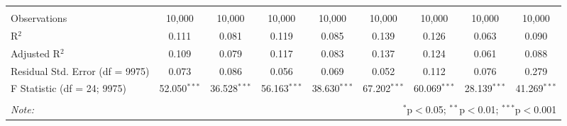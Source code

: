 \begin{table}[!htbp]
\begin{tabular}{@{\extracolsep{5pt}}lcccccccc}
 \hline \\[-1.8ex] 
Observations & 10,000 & 10,000 & 10,000 & 10,000 & 10,000 & 10,000 & 10,000 & 10,000 \\ 
R$^{2}$ & 0.111 & 0.081 & 0.119 & 0.085 & 0.139 & 0.126 & 0.063 & 0.090 \\ 
Adjusted R$^{2}$ & 0.109 & 0.079 & 0.117 & 0.083 & 0.137 & 0.124 & 0.061 & 0.088 \\ 
Residual Std. Error (df = 9975) & 0.073 & 0.086 & 0.056 & 0.069 & 0.052 & 0.112 & 0.076 & 0.279 \\ 
F Statistic (df = 24; 9975) & 52.050$^{***}$ & 36.528$^{***}$ & 56.163$^{***}$ & 38.630$^{***}$ & 67.202$^{***}$ & 60.069$^{***}$ & 28.139$^{***}$ & 41.269$^{***}$ \\ 
\hline 
\hline \\[-1.8ex] 
\textit{Note:}  & \multicolumn{8}{r}{$^{*}$p$<$0.05; $^{**}$p$<$0.01; $^{***}$p$<$0.001} \\ 
\end{tabular} 
\end{table} 
